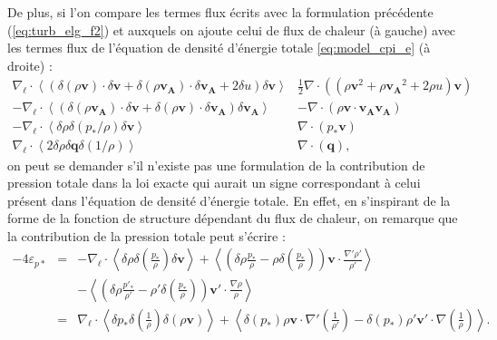 De plus, si l'on compare les termes flux écrits avec la formulation précédente (\eqref{eq:turb_elg_f2}) et auxquels on ajoute celui de flux de chaleur (à gauche) avec les termes flux de l'équation de densité d'énergie totale \eqref{eq:model_cpi_e} (à droite) : 
\begin{equation*}
\begin{array}{r|l}
  \nabla_{\boldsymbol{\ell}} \cdot \left<\left(\delta \left(\rho\boldsymbol{v}\right) \cdot \delta \boldsymbol{v}+ \delta \left(\rho\boldsymbol{v_A}\right) \cdot \delta \boldsymbol{v_A} + 2\delta u\right) \delta \boldsymbol{v} \right> & \frac{1}{2}\nabla \cdot \left(\left(\rho \boldsymbol{v}^2 + \rho \boldsymbol{v_A}^2 + 2\rho u\right) \boldsymbol{v} \right)\\
   - \nabla_{\boldsymbol{\ell}} \cdot \left<\left(\delta \left(\rho\boldsymbol{v_A}\right) \cdot \delta \boldsymbol{v}  + \delta \left(\rho\boldsymbol{v}\right) \cdot \delta \boldsymbol{v_A}  \right) \delta \boldsymbol{v_A}  \right> & - \nabla \cdot \left(\rho \boldsymbol{v} \cdot \boldsymbol{v_A}\boldsymbol{v_A}\right)\\
   -  \nabla_{\boldsymbol{\ell}} \cdot \left<\delta \rho \delta \left(p_*/\rho\right)\delta \boldsymbol{v}\right> & \nabla \cdot \left(p_* \boldsymbol{v}\right)\\
   \nabla_{\boldsymbol{\ell}} \cdot \left<2\delta \rho \delta \boldsymbol{q}\delta \left(1/\rho\right) \right> & \nabla \cdot \left(\boldsymbol{q}\right),
   \end{array}
\end{equation*}
on peut se demander s'il n'existe pas une formulation de la contribution de pression totale dans la loi exacte qui aurait un signe correspondant à celui présent dans l'équation de densité d'énergie totale. En effet, en s'inspirant de la forme de la fonction de structure dépendant du flux de chaleur, on remarque que la contribution de la pression totale peut s'écrire : 
\begin{eqnarray}
 \label{eq:turb_ref_ptot} -4\varepsilon_{p*}  &=&- \nabla_{\boldsymbol{\ell}} \cdot \left<\delta \rho  \delta \left(\frac{p_*}{\rho}\right) \delta \boldsymbol{v} \right> + \left<\left(\delta \rho \frac{p_*}{\rho} - \rho \delta \left(\frac{p_*}{\rho}\right)\right)\boldsymbol{v} \cdot \frac{\nabla' \rho'}{\rho'}\right>\nonumber\\
 &&- \left<\left(\delta \rho \frac{p'_*}{\rho'} - \rho' \delta \left(\frac{p_*}{\rho}\right)\right)\boldsymbol{v'} \cdot \frac{\nabla \rho}{\rho}\right>\nonumber\\
    &=&\nabla_{\boldsymbol{\ell}} \cdot \left<\delta p_*  \delta \left(\frac{1}{\rho}\right) \delta\left(\rho \boldsymbol{v}\right) \right> + \left< \delta \left(p_*\right) \rho \boldsymbol{v} \cdot \nabla'\left(\frac{1}{\rho'}\right) - \delta \left(p_*\right) \rho' \boldsymbol{v'} \cdot \nabla \left(\frac{1}{\rho}\right)\right> .\nonumber \\
\end{eqnarray}
